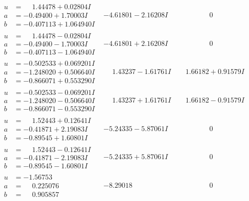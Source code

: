 \documentclass[1p]{elsarticle_modified}
\theoremstyle{definition}
\begin{document}
$$\begin{array}{c|c|c}
\begin{aligned}
u &= \phantom{-}1.44478 + 0.02804 I \\
a &= -0.49400 + 1.70003 I \\
b &= -0.407113 + 1.064940 I\end{aligned}
 & -4.61801 - 2.16208 I & \phantom{-0.000000 } 0 \\ \hline\begin{aligned}
u &= \phantom{-}1.44478 - 0.02804 I \\
a &= -0.49400 - 1.70003 I \\
b &= -0.407113 - 1.064940 I\end{aligned}
 & -4.61801 + 2.16208 I & \phantom{-0.000000 } 0 \\ \hline\begin{aligned}
u &= -0.502533 + 0.069201 I \\
a &= -1.248020 + 0.506640 I \\
b &= -0.866071 + 0.553290 I\end{aligned}
 & \phantom{-}1.43237 - 1.61761 I & \phantom{-}1.66182 + 0.91579 I \\ \hline\begin{aligned}
u &= -0.502533 - 0.069201 I \\
a &= -1.248020 - 0.506640 I \\
b &= -0.866071 - 0.553290 I\end{aligned}
 & \phantom{-}1.43237 + 1.61761 I & \phantom{-}1.66182 - 0.91579 I \\ \hline\begin{aligned}
u &= \phantom{-}1.52443 + 0.12641 I \\
a &= -0.41871 + 2.19083 I \\
b &= -0.89545 + 1.60801 I\end{aligned}
 & -5.24335 - 5.87061 I & \phantom{-0.000000 } 0 \\ \hline\begin{aligned}
u &= \phantom{-}1.52443 - 0.12641 I \\
a &= -0.41871 - 2.19083 I \\
b &= -0.89545 - 1.60801 I\end{aligned}
 & -5.24335 + 5.87061 I & \phantom{-0.000000 } 0 \\ \hline\begin{aligned}
u &= -1.56753\phantom{ +0.000000I} \\
a &= \phantom{-}0.225076\phantom{ +0.000000I} \\
b &= \phantom{-}0.905857\phantom{ +0.000000I}\end{aligned}
 & -8.29018\phantom{ +0.000000I} & \phantom{-0.000000 } 0 \\ \hline\begin{aligned}

\end{aligned}
\end{array}$$
\end{document}
